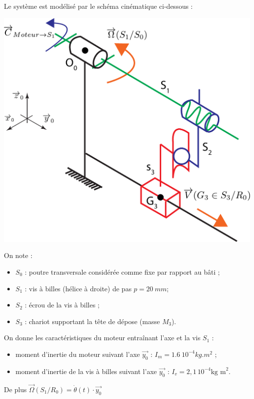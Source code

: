 \documentclass[10pt,fleqn]{article} %
\begin{document}
\begin{multicols}{2}
\begin{multicols}{2}
Le système est modélisé par le schéma cinématique ci-dessous :
\begin{center}
\includegraphics[width=0.6\linewidth]{images/schema_cine_depose_composant.pdf}
\end{center}

On note : 
\begin{itemize}
\item $S_0$ : poutre transversale considérée comme fixe par rapport au bâti ;
\item $S_1$ : vis à billes (hélice à droite) de pas $p=\SI{20}{mm}$;
\item $S_2$ : écrou de la vis à billes ;
\item $S_3$ : chariot supportant la tête de dépose (masse $M_3$).
\end{itemize}


On donne les caractéristiques du moteur entraînant l'axe et la vis $S_1$ :
\begin{itemize}
\item moment d'inertie du moteur suivant l'axe $\overrightarrow{y_0}$ : $I_m = \SI{1,6}{10^{-4} kg.m^2}$ ;
\item moment d'inertie de la vis à billes suivant l'axe $\overrightarrow{y_0}$ : $I_v = 2,1\,  10^{-4}\text{kg m}^2$.
\end{itemize}
De plus $\overrightarrow{\Omega}(S_1/R_0)=\dot{\theta}(t)\cdot \overrightarrow{y_0}$



\end{multicols}
\end{multicols}
\end{document}
